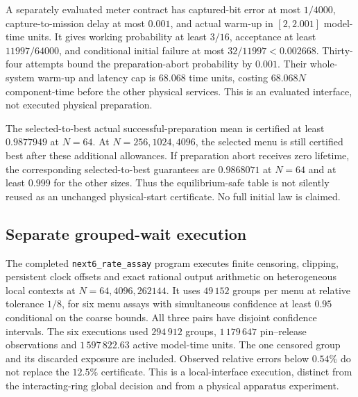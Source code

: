 A separately evaluated meter contract has captured-bit error at most
$1/4000$, capture-to-mission delay at most $0.001$, and actual warm-up
in $[2,2.001]$ model-time units. It gives working probability at least
$3/16$, acceptance at least $11997/64000$, and conditional initial
failure at most $32/11997<0.002668$. Thirty-four attempts bound the
preparation-abort probability by $0.001$. Their whole-system warm-up
and latency cap is $68.068$ time units, costing $68.068N$ component-time
before the other physical services. This is an evaluated interface,
not executed physical preparation.

The selected-to-best actual successful-preparation mean is certified
at least $0.9877949$ at $N=64$. At $N=256,1024,4096$, the selected
menu is still certified best after these additional allowances. If
preparation abort receives zero lifetime, the corresponding selected-to-best
guarantees are $0.9868071$ at $N=64$ and at least $0.999$ for the other
sizes. Thus the equilibrium-safe table is not silently reused as an
unchanged physical-start certificate. No full initial law is claimed.

\subsection{Separate grouped-wait execution}
The completed \texttt{next6\_rate\_assay} program executes finite
censoring, clipping, persistent clock offsets and exact rational output
arithmetic on heterogeneous local contexts at $N=64,4096,262144$.
It uses $49\,152$ groups per menu at relative tolerance $1/8$, for six
menu assays with simultaneous confidence at least $0.95$ conditional
on the coarse bounds. All three pairs have disjoint confidence intervals.
The six executions used $294\,912$ groups, $1\,179\,647$ pin--release
observations and $1\,597\,822.63$ active model-time units. The one
censored group and its discarded exposure are included. Observed relative
errors below $0.54\%$ do not replace the $12.5\%$ certificate.
This is a local-interface execution, distinct from the interacting-ring
global decision and from a physical apparatus experiment.

